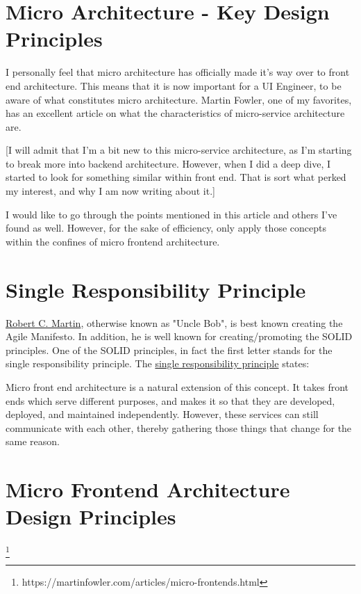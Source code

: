 \section{Micro Architecture - Key Design Principles}
I personally feel that micro architecture has officially made it's way over to front end architecture. This means that it is now important for a UI Engineer, to be aware of what constitutes micro architecture. Martin Fowler, one of my favorites, has an excellent article on what the characteristics of micro-service architecture are. 

[I will admit that I'm a bit new to this micro-service architecture, as I'm starting to break more into backend architecture. However, when I did a deep dive, I started to look for something similar within front end. That is sort what perked my interest, and why I am now writing about it.]

I would like to go through the points mentioned in this article and others I've found as well. However, for the sake of efficiency, only apply those concepts within the confines of micro frontend architecture.

\section{Single Responsibility Principle}
\href{https://en.wikipedia.org/wiki/Robert_C._Martin}{Robert C. Martin}, otherwise known as "Uncle Bob", is best known creating the Agile Manifesto. In addition, he is well known for creating/promoting the SOLID principles. One of the SOLID principles, in fact the first letter stands for the single responsibility principle. The \href{https://en.wikipedia.org/wiki/Single_responsibility_principle}{single responsibility principle} states:

\begin{quote}
\end{quote}

Micro front end architecture is a natural extension of this concept. It takes front ends which serve different purposes, and makes it so that they are developed, deployed, and maintained independently. However, these services can still communicate with each other, thereby gathering those things that change for the same reason.

\section{Micro Frontend Architecture Design Principles}
\begin{quote}
\end{quote} 
\footnote{https://martinfowler.com/articles/micro-frontends.html}

